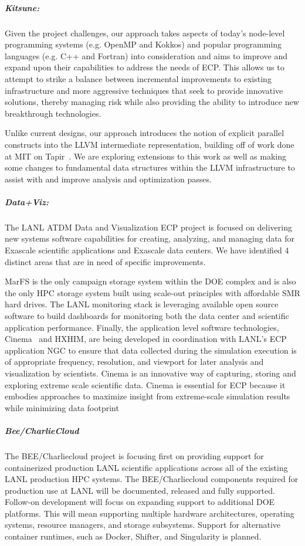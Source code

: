 \subparagraph{Kitsune:}
Given the project challenges, our approach takes aspects of
today's node-level programming systems (e.g. OpenMP and Kokkos) and
popular programming languages (e.g. C++ and Fortran) into
consideration and aims to improve and expand upon their capabilities
to address the needs of ECP.  This allows us to attempt to strike a
balance between incremental improvements to existing infrastructure
and more aggressive techniques that seek to provide innovative
solutions, thereby managing risk while also providing the ability to introduce new
breakthrough technologies.

Unlike current designs, our approach introduces the notion of explicit
parallel constructs into the LLVM intermediate representation, building
off of work done at MIT on Tapir~\cite{2.3.6.01:kitsune:Schardl:2017}. 
We are exploring extensions to this work as well as making some changes
to fundamental data structures within the LLVM infrastructure to assist with
and improve analysis and optimization passes. 


\subparagraph{Data+Viz:}
The LANL ATDM Data and Visualization ECP project is focused on delivering new
systems software capabilities for creating, analyzing, and managing data for
Exascale scientific applications and Exascale data centers. We have identified
4 distinct areas that are in need of specific improvements.

MarFS is the only campaign storage system within the DOE complex and is
also the only HPC storage system built using scale-out principles with affordable
SMR hard drives. The LANL monitoring stack is leveraging available open source
software to build dashboards for monitoring both the data center and
scientific application performance. Finally, the application level software
technologies, Cinema~\cite{cinema:Ahrens:SC14} and HXHIM, are being developed in coordination with
LANL's ECP application NGC to ensure that data collected during the simulation
execution is of appropriate frequency, resolution, and viewport for later
analysis and visualization by scientists. Cinema is an innovative way of
capturing, storing and exploring extreme scale scientific data. Cinema is
essential for ECP because it embodies approaches to maximize insight from
extreme-scale simulation results while minimizing data footprint 

\subparagraph{Bee/CharlieCloud}
The BEE/Charliecloud project is focusing first on providing support for
containerized production LANL scientific applications across all of the
existing LANL production HPC systems.  The BEE/Charliecloud components required
for production use at LANL will be documented, released and fully supported.
Follow-on development will focus on expanding support to additional DOE
platforms.  This will mean supporting multiple hardware architectures,
operating systems, resource managers, and storage subsystems.  Support for
alternative container runtimes, such as Docker, Shifter, and Singularity is
planned.

